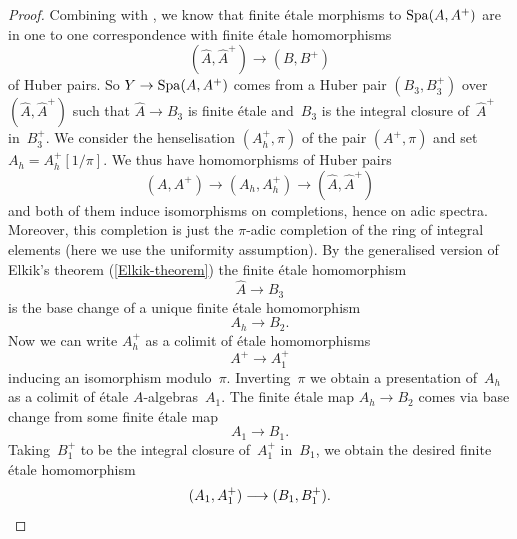 \begin{proof}
    Combining \cite[1.4.4]{HuberBook} with \cite[Corollary~1.7.3(iii)]{HuberBook}, we know that finite étale morphisms to $\operatorname{Spa}(A,A^+)$ are in one to one correspondence with finite étale homomorphisms
    \[
     (\widehat{A},\widehat{A}^+) \longrightarrow (B,B^+)
    \]
    of Huber pairs.
    So $Y \to \operatorname{Spa}(A,A^+)$ comes from a Huber pair $(B_3,B_3^+)$ over $(\widehat{A},\widehat{A}^+)$ such that $\widehat{A} \to B_3$ is finite étale and~$B_3$ is the integral closure of~$\widehat{A}^+$ in~$B_3^+$.
    We consider the henselisation $(A^+_h,\pi)$ of the pair $(A^+,\pi)$ and set $A_h=A^+_h[1/\pi]$.
    We thus have homomorphisms of Huber pairs
    \[
     (A,A^+) \longrightarrow (A_h,A^+_h) \longrightarrow (\widehat{A},\widehat{A}^+) 
    \]
    and both of them induce isomorphisms on completions, hence on adic spectra.
    Moreover, this completion is just the $\pi$-adic completion of the ring of integral elements (here we use the uniformity assumption).
    By the generalised version of Elkik's theorem (\cref{Elkik-theorem}) the finite \'etale homomorphism
    \[
     \widehat{A} \longrightarrow B_3
    \]
    is the base change of a unique finite \'etale homomorphism
    \[
     A_h \longrightarrow B_2.
    \]
    Now we can write $A^+_h$ as a colimit of étale homomorphisms
    \[
     A^+ \longrightarrow A_1^+
    \]
    inducing an isomorphism modulo~$\pi$.
    Inverting~$\pi$ we obtain a presentation of~$A_h$ as a colimit of \'etale $A$-algebras~$A_1$.
    The finite \'etale map $A_h \to B_2$ comes via base change from some finite \'etale map
    \[
     A_1 \longrightarrow B_1.
    \]
    Taking~$B_1^+$ to be the integral closure of~$A_1^+$ in~$B_1$, we obtain the desired finite \'etale homomorphism
    \[
     (A_1,A_1^+) \longrightarrow (B_1,B_1^+). \qedhere
    \]
\end{proof}

